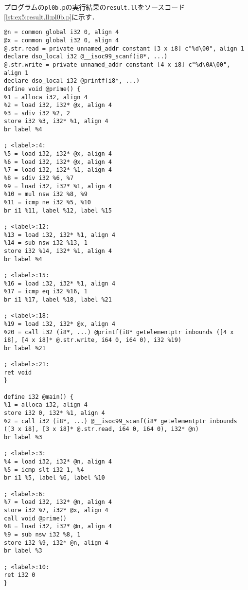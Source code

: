 \documentclass[uplatex]{jsarticle}
\begin{document}
プログラムの\verb#pl0b.p#の実行結果の\verb#result.ll#をソースコード\ref{lst:ex5:result.ll:pl0b.p}に示す．
\begin{lstlisting}[caption=condition句の処理,label=lst:ex5:result.ll:pl0b.p]
@n = common global i32 0, align 4
@x = common global i32 0, align 4
@.str.read = private unnamed_addr constant [3 x i8] c"%d\00", align 1
declare dso_local i32 @__isoc99_scanf(i8*, ...)
@.str.write = private unnamed_addr constant [4 x i8] c"%d\0A\00", align 1
declare dso_local i32 @printf(i8*, ...)
define void @prime() {
%1 = alloca i32, align 4
%2 = load i32, i32* @x, align 4
%3 = sdiv i32 %2, 2
store i32 %3, i32* %1, align 4
br label %4

; <label>:4:
%5 = load i32, i32* @x, align 4
%6 = load i32, i32* @x, align 4
%7 = load i32, i32* %1, align 4
%8 = sdiv i32 %6, %7
%9 = load i32, i32* %1, align 4
%10 = mul nsw i32 %8, %9
%11 = icmp ne i32 %5, %10
br i1 %11, label %12, label %15

; <label>:12:
%13 = load i32, i32* %1, align 4
%14 = sub nsw i32 %13, 1
store i32 %14, i32* %1, align 4
br label %4

; <label>:15:
%16 = load i32, i32* %1, align 4
%17 = icmp eq i32 %16, 1
br i1 %17, label %18, label %21

; <label>:18:
%19 = load i32, i32* @x, align 4
%20 = call i32 (i8*, ...) @printf(i8* getelementptr inbounds ([4 x i8], [4 x i8]* @.str.write, i64 0, i64 0), i32 %19)
br label %21

; <label>:21:
ret void
}

define i32 @main() {
%1 = alloca i32, align 4
store i32 0, i32* %1, align 4
%2 = call i32 (i8*, ...) @__isoc99_scanf(i8* getelementptr inbounds ([3 x i8], [3 x i8]* @.str.read, i64 0, i64 0), i32* @n)
br label %3

; <label>:3:
%4 = load i32, i32* @n, align 4
%5 = icmp slt i32 1, %4
br i1 %5, label %6, label %10

; <label>:6:
%7 = load i32, i32* @n, align 4
store i32 %7, i32* @x, align 4
call void @prime()
%8 = load i32, i32* @n, align 4
%9 = sub nsw i32 %8, 1
store i32 %9, i32* @n, align 4
br label %3

; <label>:10:
ret i32 0
}
\end{lstlisting}
\end{document}
